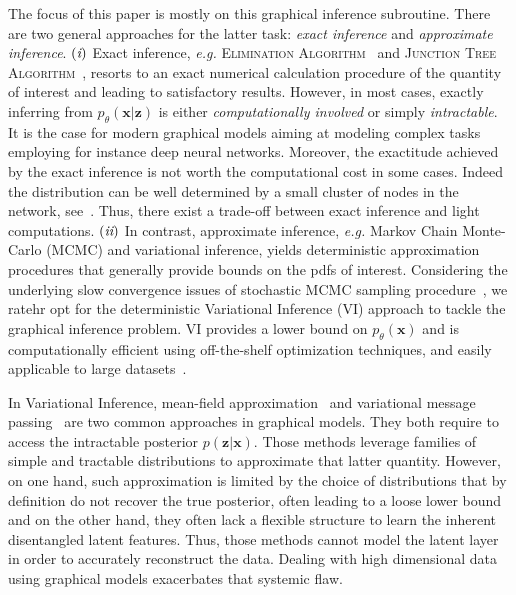 \documentclass{article} %
\newcommand{\RN}[1]{%
	\textup{\lowercase\expandafter{\it \romannumeral#1}}%
}
\begin{document}
The focus of this paper is mostly on this graphical inference subroutine. 
There are two general approaches for the latter task: \textit{exact inference} and \textit{approximate inference}. $(\RN{1})$ Exact inference, \textit{e.g.} \textsc{Elimination Algorithm}~\citep{sanner2012symbolic} and \textsc{Junction Tree Algorithm}~\citep{kahle2008junction}, resorts to an exact numerical calculation procedure of the quantity of interest and leading to satisfactory results. 
However, in most cases, exactly inferring from $p_{\theta}(\mathbf{x}|\mathbf{z})$ is either \textit{computationally involved} or simply \textit{intractable}. It is the case for modern graphical models aiming at modeling complex tasks employing for instance deep neural networks.
Moreover, the exactitude achieved by the exact inference is not worth the computational cost in some cases.
Indeed the distribution can be well determined by a small cluster of nodes in the network, see~\citet{jordan1999introduction}. Thus, there exist a trade-off between exact inference and light computations. 
$(\RN{2})$ In contrast, approximate inference, \textit{e.g.} Markov Chain Monte-Carlo (MCMC) and variational inference, yields deterministic approximation procedures that generally provide bounds on the pdfs of interest. 
Considering the underlying slow convergence issues of stochastic MCMC sampling procedure~\citep{salimans2015markov}, we ratehr opt for the deterministic Variational Inference (VI) approach to tackle the graphical inference problem.
VI provides a lower bound on $p_{\theta}(\mathbf{x})$ and is computationally efficient using off-the-shelf optimization techniques, and easily applicable to large datasets~\citep{hoffman2013stochastic, kingma2013auto, liu2016stein}.

In Variational Inference, mean-field approximation~\citep{xing2012generalized} and variational message passing~\citep{winn2005variational} are two common approaches in graphical models.
They both require to access the intractable posterior $p(\mathbf{z}|\mathbf{x})$.
Those methods leverage families of simple and tractable distributions to approximate that latter quantity.
However, on one hand, such approximation is limited by the choice of distributions that by definition do not recover the true posterior, often leading to a loose lower bound and on the other hand, they often lack a flexible structure to learn the inherent disentangled latent features. 
Thus, those methods cannot model the latent layer in order to accurately reconstruct the data. 
Dealing with high dimensional data using graphical models exacerbates that systemic flaw.
\end{document}
